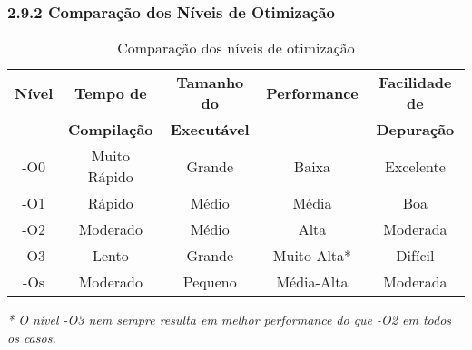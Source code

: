 \documentclass[12pt,a4paper]{article}
\begin{document}
\subsubsection*{2.9.2 Comparação dos Níveis de Otimização}
\begin{table}[h!]
    \centering
    \small
    \begin{tabular}{|c|c|c|c|c|}
        \hline
        \textbf{Nível} & \textbf{Tempo de} & \textbf{Tamanho do} & \textbf{Performance} & \textbf{Facilidade de} \\
        & \textbf{Compilação} & \textbf{Executável} & & \textbf{Depuração} \\
        \hline
        -O0 & Muito Rápido & Grande & Baixa & Excelente \\
        -O1 & Rápido & Médio & Média & Boa \\
        -O2 & Moderado & Médio & Alta & Moderada \\
        -O3 & Lento & Grande & Muito Alta* & Difícil \\
        -Os & Moderado & Pequeno & Média-Alta & Moderada \\
        \hline
    \end{tabular}
    \caption{Comparação dos níveis de otimização}
\end{table}

\noindent\textit{* O nível -O3 nem sempre resulta em melhor performance do que -O2 em todos os casos.}
\end{document}
